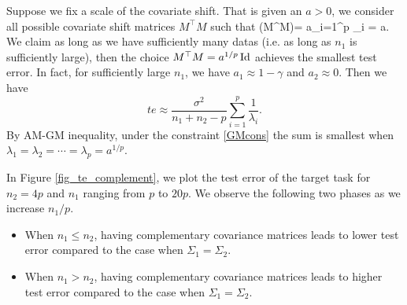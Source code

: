 {\color{blue}
Suppose we fix a scale of the covariate shift. That is given an $a>0$, we consider all possible covariate shift matrices $M^\top M$ such that
\be\label{GMcons}\det(M^\top M)= a\Leftrightarrow \prod_{i=1}^p \lambda_i = a.\ee
We claim as long as we have sufficiently many datas (i.e. as long as $n_1$ is sufficiently large), then the choice $M^\top M = a^{1/p}\operatorname{Id} $ achieves the smallest test error. In fact, for sufficiently large $n_1$, we have $a_1\approx 1-\gamma$ and $a_2\approx 0$. Then we have
$$te\approx \frac{\sigma^2}{n_1+n_2-p} \sum_{i=1}^p \frac{1}{\lambda_i}.$$
By AM-GM inequality, under the constraint \eqref{GMcons} the sum is smallest when $\lambda_1=\lambda_2=\cdots=\lambda_p = a^{1/p}$.
}


In Figure \ref{fig_te_complement}, we plot the test error of the target task for $n_2 = 4p$ and $n_1$ ranging from $p$ to $20p$.
We observe the following two phases as we increase $n_1 / p$.
\begin{itemize}
	\item When $n_1 \le n_2$, having complementary covariance matrices leads to lower test error compared to the case when $\Sigma_1 = \Sigma_2$.
	\item When $n_1 > n_2$, having complementary covariance matrices leads to higher test error compared to the case when $\Sigma_1 = \Sigma_2$.
\end{itemize}


